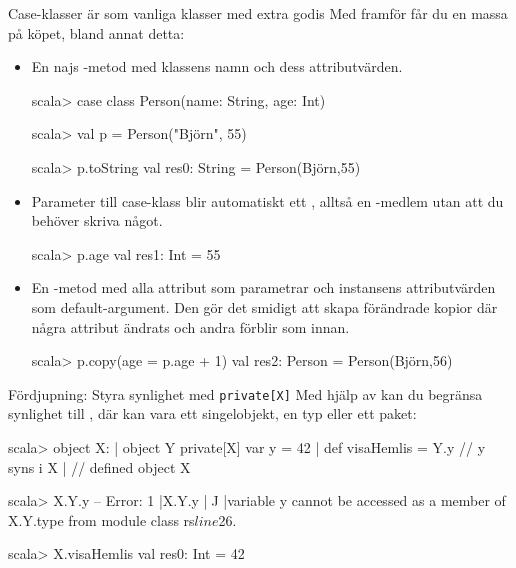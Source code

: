 \begin{Slide}{Case-klasser är som vanliga klasser med extra godis}
\SlideFontTiny
Med  framför  får du en massa  på köpet, bland annat detta:
\begin{itemize}\SlideFontTiny
\item En najs -metod med klassens namn och dess attributvärden.
\begin{REPLsmall}
scala> case class Person(name: String, age: Int)

scala> val p = Person("Björn", 55)

scala> p.toString
val res0: String = Person(Björn,55)

\end{REPLsmall}
\item Parameter till case-klass blir automatiskt ett , alltså en -medlem utan att du behöver skriva något.
\begin{REPLsmall}
scala> p.age
val res1: Int = 55
\end{REPLsmall}
\item En -metod med alla attribut som parametrar och instansens attributvärden som default-argument. Den gör det smidigt att skapa förändrade kopior där några attribut ändrats och andra förblir som innan.  
\begin{REPLsmall}
scala> p.copy(age = p.age + 1)
val res2: Person = Person(Björn,56)
\end{REPLsmall}
\end{itemize}
\end{Slide}


\begin{Slide}{Fördjupning: Styra synlighet med \texttt{private[X]}}
Med hjälp av  kan du begränsa synlighet till , där  kan vara ett singelobjekt, en typ eller ett paket:
\begin{REPLsmall}
scala> object  X: 
     |   object Y { private[X] var y = 42 }
     |   def visaHemlis = Y.y  // y syns i X
     | 
// defined object X

scala> X.Y.y
-- Error:
1 |X.Y.y
  |^^^^^
  |variable y cannot be accessed as a member of X.Y.type from module class rs$line$26.

scala> X.visaHemlis
val res0: Int = 42

\end{REPLsmall}
\end{Slide}

